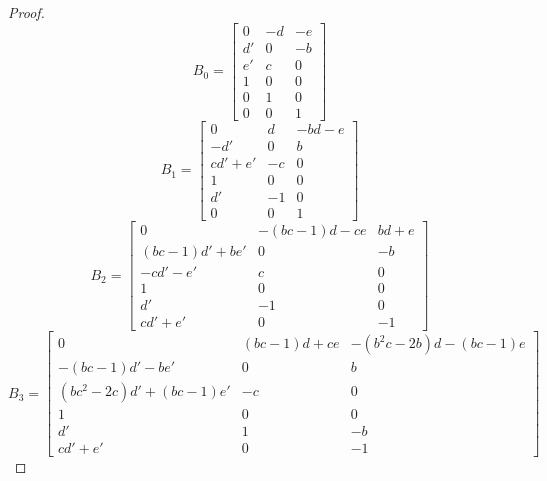 \documentclass{amsart}
\numberwithin{theorem}{section}
\begin{document}
  \begin{proof}
    \[B_0=\left[\begin{array}{ccc} 0 & -d & -e \\ d' & 0 & -b\\ e' & c & 0\\ 1 & 0 & 0\\ 0 & 1 & 0\\ 0 & 0 & 1\end{array}\right]\]
    \[B_1=\left[\begin{array}{ccc} 0 & d & -bd-e \\ -d' & 0 & b\\ cd'+e' & -c & 0\\ 1 & 0 & 0\\ d' & -1 & 0\\ 0 & 0 & 1\end{array}\right]\]
    \[B_2=\left[\begin{array}{ccc} 0 & -(bc-1)d-ce & bd+e \\ (bc-1)d'+be' & 0 & -b\\ -cd'-e' & c & 0\\ 1 & 0 & 0\\ d' & -1 & 0\\ cd'+e' & 0 & -1\end{array}\right]\]
    \[B_3=\left[\begin{array}{ccc} 0 & (bc-1)d+ce & -(b^2c-2b)d-(bc-1)e \\ -(bc-1)d'-be' & 0 & b\\ (bc^2-2c)d'+(bc-1)e' & -c & 0\\ 1 & 0 & 0\\ d' & 1 & -b\\ cd'+e' & 0 & -1\end{array}\right]\]
    

\end{proof}
\end{document}
